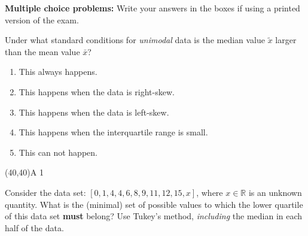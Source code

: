 \documentclass[addpoints]{exam}
\def\solutions{0}
\begin{document}
{\renewcommand{\arraystretch}{1.5}

\vspace{8mm}



\label{---Problems---}


\vspace{3cm}

{\begin{center} {\bf Multiple choice problems:} Write your answers in the boxes if using a printed version of the exam. \end{center}}\vspace{2mm}

\begin{questions}
\question[3]  Under what standard conditions for \textit{unimodal} data is the median value $\tilde{x}$ larger than the mean value $\bar{x}$?

\vspace{2mm}
\begin{minipage}[b]{.85\textwidth}
	\begin{enumerate}[label=\Alph*.]
		\item This always happens.
		\item This happens when the data is right-skew.
		\item This happens when the data is left-skew.
		\item This happens when the interquartile range is small.
		\item This can not happen.
	\end{enumerate}
\end{minipage}
\begin{minipage}[b]{.1\textwidth}
	\vspace{\fill}\framebox(40,40){A \if\solutions1 \fi}
\end{minipage}

\question[3]  Consider the data set:  $[ 0,1,4,4,6, 8, 9, 11,12,15,x]$, where $x \in \mathbb{R}$ is an unknown quantity. What is the (minimal) set of possible values to which the lower quartile of this data set \textbf{must} belong?  Use Tukey's method, \textit{including} the median in each half of the data.
\vspace{2mm}


\end{questions}}
\end{document}
